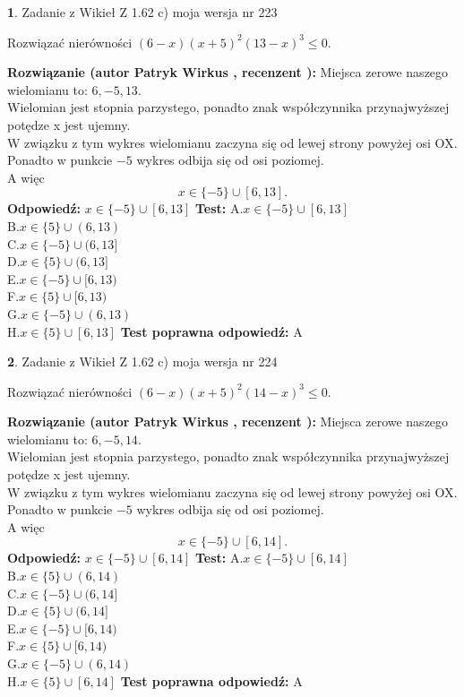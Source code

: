 \documentclass[12pt, a4paper]{article}
\theoremstyle{definition} %
\newtheorem{zad}{}
\newcommand{\zadStart}[1]{\begin{zad}#1\newline}
\newcommand{\zadStop}{\end{zad}}
\newcommand{\rozwStart}[2]{\noindent \textbf{Rozwiązanie (autor #1 , recenzent #2): }\newline}
\newcommand{\rozwStop}{\newline}
\newcommand{\odpStart}{\noindent \textbf{Odpowiedź:}\newline}
\newcommand{\odpStop}{\newline}
\newcommand{\testStart}{\noindent \textbf{Test:}\newline}
\newcommand{\testStop}{\newline}
\newcommand{\kluczStart}{\noindent \textbf{Test poprawna odpowiedź:}\newline}
\newcommand{\kluczStop}{\newline}
\begin{document}
\zadStart{Zadanie z Wikieł Z 1.62 c) moja wersja nr 223}

Rozwiązać nierówności $(6-x)(x+5)^{2}(13-x)^{3}\le0$.
\zadStop
\rozwStart{Patryk Wirkus}{}
Miejsca zerowe naszego wielomianu to: $6, -5, 13$.\\
Wielomian jest stopnia parzystego, ponadto znak współczynnika przy\linebreak najwyższej potędze x jest ujemny.\\ W związku z tym wykres wielomianu zaczyna się od lewej strony powyżej osi OX.\\
Ponadto w punkcie $-5$ wykres odbija się od osi poziomej.\\
A więc $$x \in \{-5\} \cup [6,13].$$
\rozwStop
\odpStart
$x \in \{-5\} \cup [6,13]$
\odpStop
\testStart
A.$x \in \{-5\} \cup [6,13]$\\
B.$x \in \{5\} \cup (6,13)$\\
C.$x \in \{-5\} \cup (6,13]$\\
D.$x \in \{5\} \cup (6,13]$\\
E.$x \in \{-5\} \cup [6,13)$\\
F.$x \in \{5\} \cup [6,13)$\\
G.$x \in \{-5\} \cup (6,13)$\\
H.$x \in \{5\} \cup [6,13]$
\testStop
\kluczStart
A
\kluczStop



\zadStart{Zadanie z Wikieł Z 1.62 c) moja wersja nr 224}

Rozwiązać nierówności $(6-x)(x+5)^{2}(14-x)^{3}\le0$.
\zadStop
\rozwStart{Patryk Wirkus}{}
Miejsca zerowe naszego wielomianu to: $6, -5, 14$.\\
Wielomian jest stopnia parzystego, ponadto znak współczynnika przy\linebreak najwyższej potędze x jest ujemny.\\ W związku z tym wykres wielomianu zaczyna się od lewej strony powyżej osi OX.\\
Ponadto w punkcie $-5$ wykres odbija się od osi poziomej.\\
A więc $$x \in \{-5\} \cup [6,14].$$
\rozwStop
\odpStart
$x \in \{-5\} \cup [6,14]$
\odpStop
\testStart
A.$x \in \{-5\} \cup [6,14]$\\
B.$x \in \{5\} \cup (6,14)$\\
C.$x \in \{-5\} \cup (6,14]$\\
D.$x \in \{5\} \cup (6,14]$\\
E.$x \in \{-5\} \cup [6,14)$\\
F.$x \in \{5\} \cup [6,14)$\\
G.$x \in \{-5\} \cup (6,14)$\\
H.$x \in \{5\} \cup [6,14]$
\testStop
\kluczStart
A
\kluczStop
\end{document}

